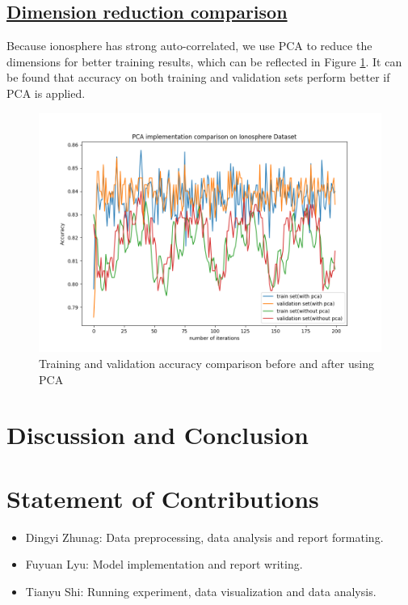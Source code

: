 \documentclass[11pt]{scrartcl}
\begin{document}
\subsection*{\underline{Dimension reduction comparison}}
Because ionosphere has strong auto-correlated, we use PCA to reduce the dimensions for better training results, which can be reflected in Figure \ref{pca}. It can be found that accuracy on both training and validation sets perform better if PCA is applied.

\begin{figure}[htbp]
	\centering
	\includegraphics[width=0.7\linewidth]{fig/PCA.png}
	\caption{Training and validation accuracy comparison before and after using PCA}
	\label{pca}
\end{figure}

\section{Discussion and Conclusion}

\section{Statement of Contributions}

\begin{itemize}
	\item Dingyi Zhunag: Data preprocessing, data analysis and report formating.
	\item Fuyuan Lyu: Model implementation and report writing.
	\item Tianyu Shi: Running experiment, data visualization and data analysis.
\end{itemize}



\end{document}
